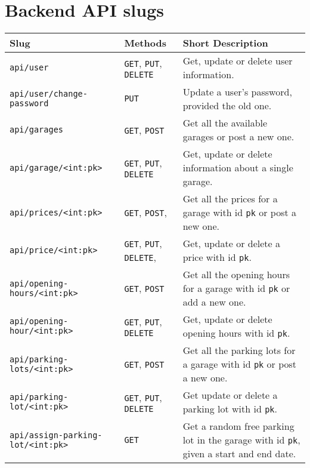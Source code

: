 \section{Backend API slugs}\label{app:backend-api-slugs}
\begin{table}[htp]
    \centering
    \begin{tabular}{|l|l|p{7cm}|}
        \hline
         \textbf{Slug} & \textbf{Methods} & \textbf{Short Description}  \\
         \hline
         \hline
         \texttt{api/user} &  \texttt{GET}, \texttt{PUT}, \texttt{DELETE} & Get, update or delete user information.\\
        \hline
        \texttt{api/user/change-password} &  \texttt{PUT} & Update a user's password, provided the old one.\\
        \hline
        \texttt{api/garages} &  \texttt{GET}, \texttt{POST}& Get all the available garages or post a new one.\\
        \hline
        \texttt{api/garage/<int:pk>} &  \texttt{GET}, \texttt{PUT}, \texttt{DELETE
        } & Get, update or delete information about a single garage.\\
        \hline
        \texttt{api/prices/<int:pk>} &  \texttt{GET}, \texttt{POST}, 
         & Get all the prices for a garage with id \texttt{pk} or post a new one.\\
        \hline
        \texttt{api/price/<int:pk>} &  \texttt{GET}, \texttt{PUT}, \texttt{DELETE}, 
         & Get, update or delete a price with id \texttt{pk}.\\
        \hline
        \texttt{api/opening-hours/<int:pk>} &  \texttt{GET}, \texttt{POST} & Get all the opening hours for a garage with id \texttt{pk} or add a new one.\\
        \hline
        \texttt{api/opening-hour/<int:pk>} & \texttt{GET}, \texttt{PUT}, \texttt{DELETE} & Get, update or delete opening hours with id \texttt{pk}.\\
        \hline
        \texttt{api/parking-lots/<int:pk>} &  \texttt{GET}, \texttt{POST} & Get all the parking lots for a garage with id \texttt{pk} or post a new one.\\
        \hline
        \texttt{api/parking-lot/<int:pk>} &  \texttt{GET}, \texttt{PUT}, \texttt{DELETE
        } & Get update or delete a parking lot with id \texttt{pk}. \\
        \hline
        \texttt{api/assign-parking-lot/<int:pk>} &  \texttt{GET} & Get a random free parking lot in the garage with id \texttt{pk}, given a start and end date. \\

\end{tabular}
\end{table}
